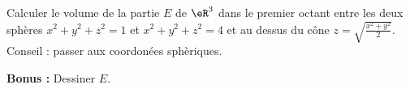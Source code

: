 \begin{exercice}\label{exoGeomAnal-0039}

Calculer le volume de la partie $E$ de $\eR^3$ dans le premier octant entre les deux sphères $x^2+y^2+z^2=1$ et $x^2+y^2+z^2=4$ et au dessus du cône $\displaystyle z=\sqrt{\frac{x^2+y^2}{2}}$. Conseil : passer aux coordonées sphèriques.  

\textbf{Bonus :} Dessiner $E$.



\end{exercice}
